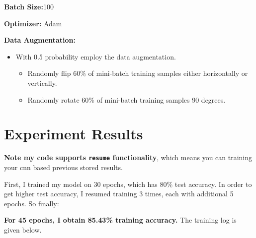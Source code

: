 \documentclass[11pt]{article}
\providecommand{\tightlist}{%
      \setlength{\itemsep}{0pt}\setlength{\parskip}{0pt}}
\begin{document}
\textbf{Batch Size:}100

\textbf{Optimizer:} Adam

\textbf{Data Augmentation:}

\begin{itemize}
\tightlist
\item
  With 0.5 probability employ the data augmentation.

  \begin{itemize}
  \tightlist
  \item
    Randomly flip 60\% of mini-batch training samples either
    horizontally or vertically.
  \item
    Randomly rotate 60\% of mini-batch training samples 90 degrees.
  \end{itemize}
\end{itemize}

    \hypertarget{experiment-results}{%
\section{Experiment Results}\label{experiment-results}}

\textbf{Note my code supports \texttt{resume} functionality}, which
means you can training your cnn based previous stored results.

First, I trained my model on 30 epochs, which has 80\% test accuracy. In
order to get higher test accuracy, I resumed training 3 times, each with
additional 5 epochs. So finally:

\textbf{For 45 epochs, I obtain 85.43\% training accuracy.} The training
log is given below.
\end{document}
